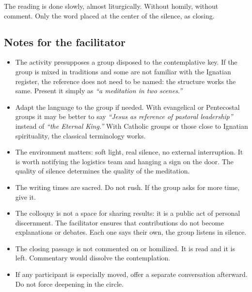 \documentclass[11pt, a4paper]{article}
\begin{document}
\begin{actividad}
The reading is done slowly, almost liturgically. Without homily, without comment. Only the word placed at the center of the silence, as closing.

\subsection*{Notes for the facilitator}
\begin{itemize}
  \item The activity presupposes a group disposed to the contemplative key. If the group is mixed in traditions and some are not familiar with the Ignatian register, the reference does not need to be named: the structure works the same. Present it simply as \emph{``a meditation in two scenes.''}
  \item Adapt the language to the group if needed. With evangelical or Pentecostal groups it may be better to say \emph{``Jesus as reference of pastoral leadership''} instead of \emph{``the Eternal King.''} With Catholic groups or those close to Ignatian spirituality, the classical terminology works.
  \item The environment matters: soft light, real silence, no external interruption. It is worth notifying the logistics team and hanging a sign on the door. The quality of silence determines the quality of the meditation.
  \item The writing times are sacred. Do not rush. If the group asks for more time, give it.
  \item The colloquy is not a space for sharing results: it is a public act of personal discernment. The facilitator ensures that contributions do not become explanations or debates. Each one says their own, the group listens in silence.
  \item The closing passage is not commented on or homilized. It is read and it is left. Commentary would dissolve the contemplation.
  \item If any participant is especially moved, offer a separate conversation afterward. Do not force deepening in the circle.
\end{itemize}

\end{actividad}

\newpage
\end{document}
